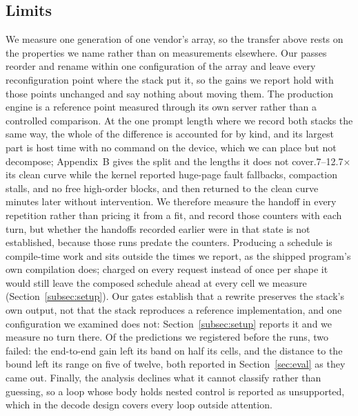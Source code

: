 \subsection{Limits}
\label{subsec:limits}
We measure one generation of one vendor's array, so the transfer above rests on the properties we name rather than on measurements elsewhere.
Our passes reorder and rename within one configuration of the array and leave every reconfiguration point where the stack put it, so the gains we report hold with those points unchanged and say nothing about moving them.
The production engine is a reference point measured through its own server rather than a controlled comparison. At the one prompt length where we record both stacks the same way, the whole of the difference is accounted for by kind, and its largest part is host time with no command on the device, which we can place but not decompose; Appendix~B gives the split and the lengths it does not cover.7--12.7$\times$ its clean curve while the kernel reported huge-page fault fallbacks, compaction stalls, and no free high-order blocks, and then returned to the clean curve minutes later without intervention.
We therefore measure the handoff in every repetition rather than pricing it from a fit, and record those counters with each turn, but whether the handoffs recorded earlier were in that state is not established, because those runs predate the counters.
Producing a schedule is compile-time work and sits outside the times we report, as the shipped program's own compilation does; charged on every request instead of once per shape it would still leave the composed schedule ahead at every cell we measure (Section~\ref{subsec:setup}).
Our gates establish that a rewrite preserves the stack's own output, not that the stack reproduces a reference implementation, and one configuration we examined does not: Section~\ref{subsec:setup} reports it and we measure no turn there.
Of the predictions we registered before the runs, two failed: the end-to-end gain left its band on half its cells, and the distance to the bound left its range on five of twelve, both reported in Section~\ref{sec:eval} as they came out.
Finally, the analysis declines what it cannot classify rather than guessing, so a loop whose body holds nested control is reported as unsupported, which in the decode design covers every loop outside attention.
